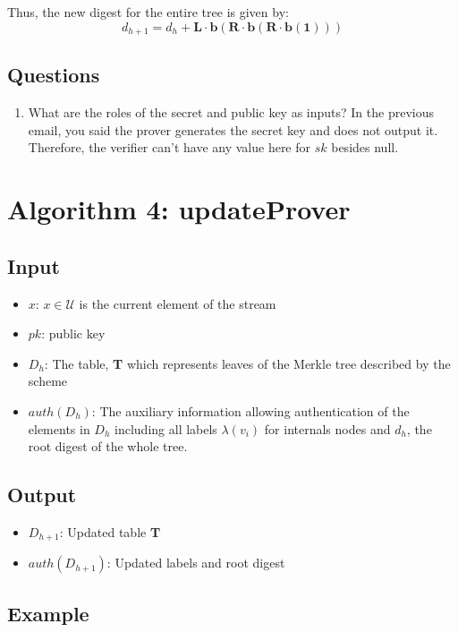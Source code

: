 \documentclass[11pt, letterpaper, oneside]{article}
\begin{document}
	Thus, the new digest for the entire tree is given by:
	\begin{equation}
	d_{h+1} = d_{h} + \textbf{L} \cdot \textbf{b} ( \textbf{R} \cdot \textbf{b} ( \textbf{R} \cdot \textbf{b} ( \textbf{1} ) )  )
	\end{equation}
	
\subsection{Questions}
\begin{enumerate}
\item What are the roles of the secret and public key as inputs?  In the previous email, you said the prover generates the secret key and does not output it. Therefore, the verifier can't have any value here for $sk$ besides null.
\end{enumerate}
	
\section{Algorithm 4: updateProver}
\subsection{Input}
	\begin{itemize}
	\item $x$: $x \in \mathcal{U}$ is the current element of the stream
	\item $pk$:  public key
	\item $D_{h}$: The table, \textbf{T} which represents leaves of the Merkle tree described by the scheme
	\item $auth(D_{h})$: The auxiliary information allowing authentication of the elements in $D_{h}$ including all labels $\lambda(v_{i})$ for internals nodes and $d_{h}$, the root digest of the whole tree.
	\end{itemize}
\subsection{Output}

	\begin{itemize}
	\item $D_{h + 1}$: Updated table \textbf{T}
	\item $auth(D_{h + 1})$: Updated labels and root digest
	\end{itemize}

\subsection{Example}
\end{document}
